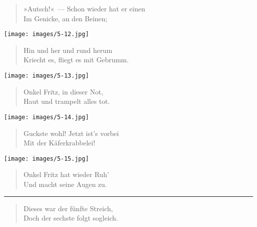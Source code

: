 \documentclass[a4paper,12pt]{article}
\begin{document}
\begin{verse}
»Autsch!«~— Schon wieder hat er einen\\{}
Im Genicke, an den Beinen;
\end{verse}



\begin{center}\texttt{[image: images/5-12.jpg]}\end{center}



\begin{verse}
Hin und her und rund herum\\{}
Kriecht es, fliegt es mit Gebrumm.
\end{verse}



\begin{center}\texttt{[image: images/5-13.jpg]}\end{center}



\begin{verse}
Onkel Fritz, in dieser Not,\\{}
Haut und trampelt alles tot.
\end{verse}



\begin{center}\texttt{[image: images/5-14.jpg]}\end{center}



\begin{verse}
Guckste wohl! Jetzt ist's vorbei\\{}
Mit der Käferkrabbelei!
\end{verse}



\begin{center}\texttt{[image: images/5-15.jpg]}\end{center}



\begin{verse}
Onkel Fritz hat wieder Ruh'\\{}
Und macht seine Augen zu.
\end{verse}


\hrule


\begin{verse}
Dieses war der fünfte Streich,\\{}
Doch der sechste folgt sogleich.
\end{verse}
\end{document}
